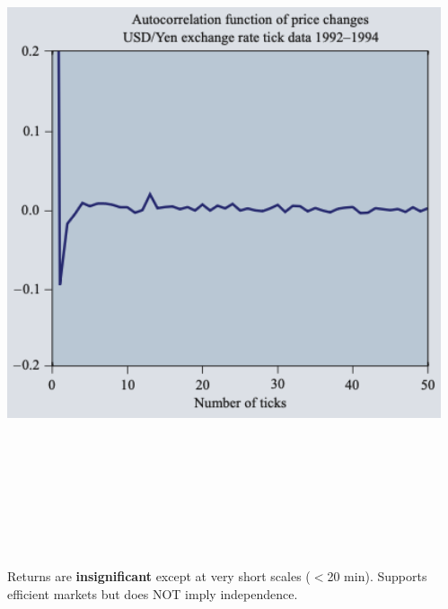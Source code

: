 \documentclass[final]{beamer}
\begin{document}
\begin{frame}[t]
\begin{columns}[t]
\begin{column}{.48\linewidth}
\vspace{0.5cm}



\end{column}

\begin{column}{.48\linewidth}


\begin{tcolorbox}[mybox, title=Linear Autocorrelations]
\begin{center}
\includegraphics[width=0.95\linewidth,height=20cm,keepaspectratio]{figure6_autocorr.png}
\end{center}
\vspace{0.3cm}
\large
Returns are \textbf{insignificant} except at very short scales ($<$20 min). Supports efficient markets but does NOT imply independence.
\end{tcolorbox}



\end{column}
\end{columns}
\end{frame}
\end{document}
